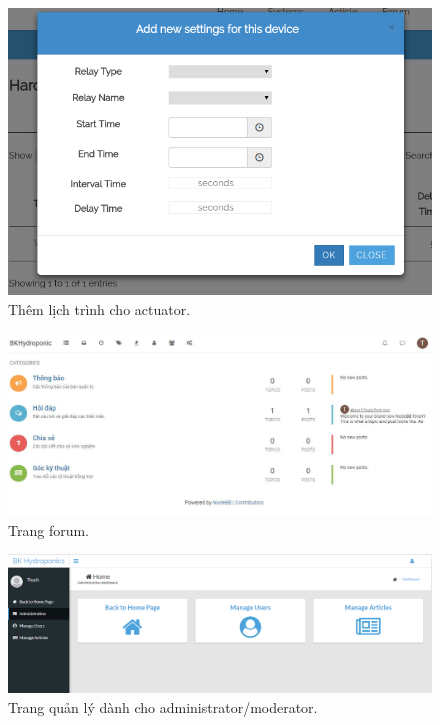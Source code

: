 \documentclass[a4paper,12pt,oneside]{article}
\begin{document}
\begin{center}
\begin{figure}[H]
\centering
\includegraphics[scale=.5]{hinh/web_add_schedule.png}
\caption{Thêm lịch trình cho actuator.}
\end{figure}


\begin{figure}[H]
\centering
\includegraphics[scale=.5]{hinh/web_forum.jpg}
\caption{Trang forum.}
\end{figure}

\begin{figure}[H]
\centering
\includegraphics[scale=.38]{hinh/admin_page.png}
\caption{Trang quản lý dành cho administrator/moderator.}
\end{figure}

\end{center}
\end{document}
